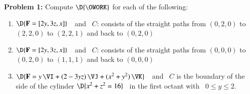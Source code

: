 \documentclass[11pt]{article}
\begin{document}


\vspace{0.2cm}

{\bf Problem 1:} Compute $\D{\OWORK}$ for each of the following:

\begin{enumerate}
	\item[a.] $\D{{\bf F} = [2y,3z,x]}$ \,\, and \, $C$: consists of the straight paths from $(0,2,0)$ to $(2,2,0)$ to $(2,2,1)$ and back to $(0,2,0)$
	
	\vspace{0.2cm}
	
	\item[b.] $\D{{\bf F} = [2y,3z,x]}$ \,\, and \, $C$: consists of the straight paths from $(0,0,0)$ to $(0,2,0)$ to $(1,1,1)$ and back to $(0,0,0)$ 
	
	\vspace{0.2cm}
	
	\item[c.] $\D{{\bf F} = y\,\VI + (2-3yz)\, \VJ + (x^2+y^2)\, \VK}$ \,\, and \, $C$ is the boundary of the side of the cylinder $\D{x^2 + z^2 = 16}$ \, in the first octant with \, $0 \le y \le 2$. 
		
\end{enumerate}

\vspace{0.2cm}

%
%		
%	
%		

\end{document}
